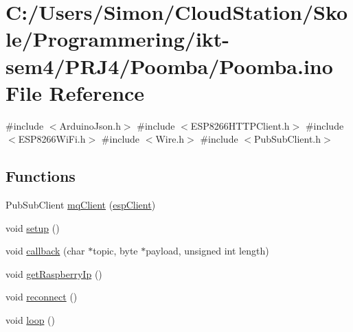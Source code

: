 \hypertarget{_poomba_8ino}{}\section{C\+:/\+Users/\+Simon/\+Cloud\+Station/\+Skole/\+Programmering/ikt-\/sem4/\+P\+R\+J4/\+Poomba/\+Poomba.ino File Reference}
\label{_poomba_8ino}
{\ttfamily \#include $<$Arduino\+Json.\+h$>$}\newline
{\ttfamily \#include $<$E\+S\+P8266\+H\+T\+T\+P\+Client.\+h$>$}\newline
{\ttfamily \#include $<$E\+S\+P8266\+Wi\+Fi.\+h$>$}\newline
{\ttfamily \#include $<$Wire.\+h$>$}\newline
{\ttfamily \#include $<$Pub\+Sub\+Client.\+h$>$}\newline
\subsection*{Functions}
\begin{DoxyCompactItemize}
\item 
Pub\+Sub\+Client \mbox{\hyperlink{_poomba_8ino_a3723ecd4627fe1acd7f94dd266f1105a}{mq\+Client}} (\mbox{\hyperlink{_snap_box_8ino_abd77e757e4b3bb6f1e4b42b21ea9e040}{esp\+Client}})
\item 
void \mbox{\hyperlink{_poomba_8ino_a4fc01d736fe50cf5b977f755b675f11d}{setup}} ()
\item 
void \mbox{\hyperlink{_poomba_8ino_ac3a129f66dc859e2b7279565f4e1de78}{callback}} (char $\ast$topic, byte $\ast$payload, unsigned int length)
\item 
void \mbox{\hyperlink{_poomba_8ino_a7a69432900bad935bd00eb0a9d4bf61f}{get\+Raspberry\+Ip}} ()
\item 
void \mbox{\hyperlink{_poomba_8ino_a4bcd6ce7d04c38f8c4ff908d1fc50f86}{reconnect}} ()
\item 
void \mbox{\hyperlink{_poomba_8ino_afe461d27b9c48d5921c00d521181f12f}{loop}} ()
\end{DoxyCompactItemize}
